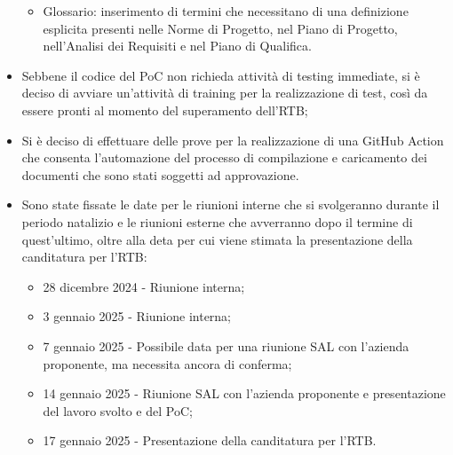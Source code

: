 \begin{itemize}
\begin{itemize}
        \item Glossario: inserimento di termini che necessitano di una definizione esplicita presenti nelle Norme di Progetto, nel Piano di Progetto, nell'Analisi dei Requisiti e nel Piano di Qualifica. 
    \end{itemize}
    \item Sebbene il codice del PoC non richieda attività di testing immediate, si è deciso di avviare un’attività di training per la realizzazione di test, così da essere pronti al momento del superamento dell’RTB;
    \item Si è deciso di effettuare delle prove per la realizzazione di una GitHub Action che consenta l'automazione del processo di compilazione e caricamento dei documenti che sono stati soggetti ad approvazione.
    \item Sono state fissate le date per le riunioni interne che si svolgeranno durante il periodo natalizio e le riunioni esterne che avverranno dopo il termine di quest'ultimo, oltre alla deta per cui viene stimata la presentazione della canditatura per l'RTB:
    \begin{itemize}
        \item 28 dicembre 2024 - Riunione interna;
        \item 3 gennaio 2025 - Riunione interna;
        \item 7 gennaio 2025 - Possibile data per una riunione SAL con l'azienda proponente, ma necessita ancora di conferma;
        \item 14 gennaio 2025 - Riunione SAL con l'azienda proponente e presentazione del lavoro svolto e del PoC;
        \item 17 gennaio 2025 - Presentazione della canditatura per l'RTB.
    \end{itemize}
\end{itemize}